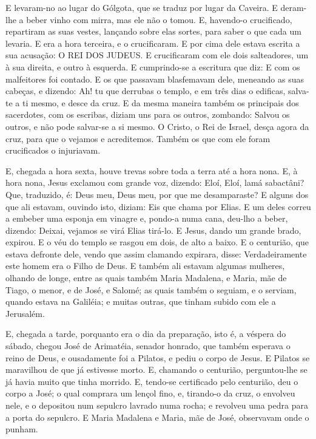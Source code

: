 E levaram-no ao lugar do Gólgota, que se traduz por lugar da
Caveira. E deram-lhe a beber vinho com mirra, mas ele não o
tomou. E, havendo-o crucificado, repartiram as suas vestes,
lançando sobre elas sortes, para saber o que cada um levaria.
E era a hora terceira, e o crucificaram. E por cima
dele estava escrita a sua acusação: O REI DOS JUDEUS. E
crucificaram com ele dois salteadores, um à sua direita, e outro à
esquerda. E cumprindo-se a escritura que diz: E com os
malfeitores foi contado. E os que passavam blasfemavam dele,
meneando as suas cabeças, e dizendo: Ah! tu que derrubas o templo, e
em três dias o edificas, salva-te a ti mesmo, e desce da
cruz. E da mesma maneira também os principais dos sacerdotes,
com os escribas, diziam uns para os outros, zombando: Salvou os
outros, e não pode salvar-se a si mesmo. O Cristo, o Rei de
Israel, desça agora da cruz, para que o vejamos e acreditemos.
Também os que com ele foram crucificados o injuriavam.

E, chegada a hora sexta, houve trevas sobre toda a terra até a
hora nona. E, à hora nona, Jesus exclamou com grande voz,
dizendo: Eloí, Eloí, lamá sabactâni? Que, traduzido, é: Deus meu,
Deus meu, por que me desamparaste? E alguns dos que ali
estavam, ouvindo isto, diziam: Eis que chama por Elias. E um
deles correu a embeber uma esponja em vinagre e, pondo-a numa cana,
deu-lho a beber, dizendo: Deixai, vejamos se virá Elias tirá-lo.
E Jesus, dando um grande brado, expirou. E o véu do
templo se rasgou em dois, de alto a baixo. E o centurião, que
estava defronte dele, vendo que assim clamando expirara, disse:
Verdadeiramente este homem era o Filho de Deus. E também ali
estavam algumas mulheres, olhando de longe, entre as quais também
Maria Madalena, e Maria, mãe de Tiago, o menor, e de José, e Salomé;
as quais também o seguiam, e o serviam, quando estava na
Galiléia; e muitas outras, que tinham subido com ele a Jerusalém.

E, chegada a tarde, porquanto era o dia da preparação, isto é, a
véspera do sábado, chegou José de Arimatéia, senador honrado,
que também esperava o reino de Deus, e ousadamente foi a Pilatos, e
pediu o corpo de Jesus. E Pilatos se maravilhou de que já
estivesse morto. E, chamando o centurião, perguntou-lhe se já havia
muito que tinha morrido. E, tendo-se certificado pelo
centurião, deu o corpo a José; o qual comprara um lençol
fino, e, tirando-o da cruz, o envolveu nele, e o depositou num
sepulcro lavrado numa rocha; e revolveu uma pedra para a porta do
sepulcro. E Maria Madalena e Maria, mãe de José, observavam
onde o punham.

